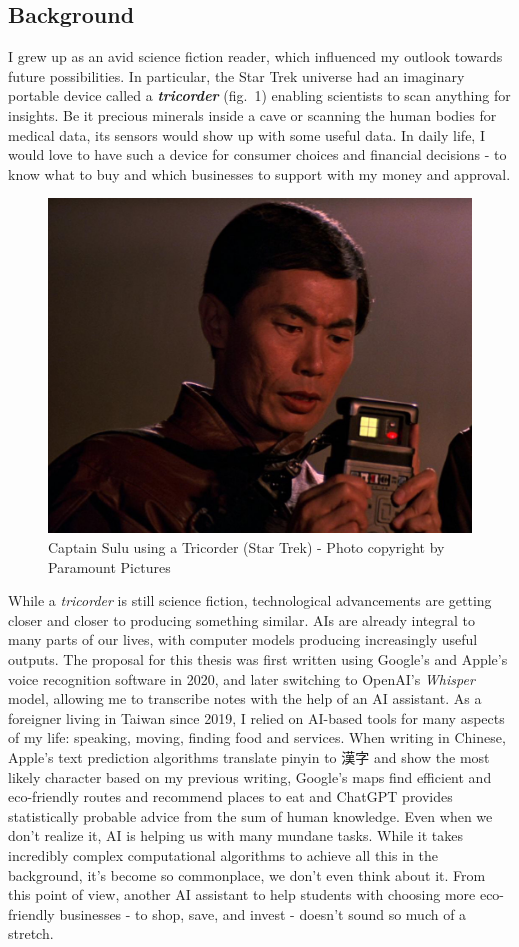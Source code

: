 \documentclass[
  letterpaper,
  DIV=11,
  numbers=noendperiod]{scrartcl}
\begin{document}
\subsection{Background}\label{background}

I grew up as an avid science fiction reader, which influenced my outlook
towards future possibilities. In particular, the Star Trek universe had
an imaginary portable device called a \textbf{\emph{tricorder}} (fig.~1)
enabling scientists to scan anything for insights. Be it precious
minerals inside a cave or scanning the human bodies for medical data,
its sensors would show up with some useful data. In daily life, I would
love to have such a device for consumer choices and financial decisions
- to know what to buy and which businesses to support with my money and
approval.

\begin{figure}[H]

{\centering \includegraphics[width=0.5\linewidth,height=\textheight,keepaspectratio]{./images/introduction/tricorder.jpg}

}

\caption{Captain Sulu using a Tricorder (Star Trek) - Photo copyright by
Paramount Pictures}

\end{figure}%

While a \emph{tricorder} is still science fiction, technological
advancements are getting closer and closer to producing something
similar. AIs are already integral to many parts of our lives, with
computer models producing increasingly useful outputs. The proposal for
this thesis was first written using Google's and Apple's voice
recognition software in 2020, and later switching to OpenAI's
\emph{Whisper} model, allowing me to transcribe notes with the help of
an AI assistant. As a foreigner living in Taiwan since 2019, I relied on
AI-based tools for many aspects of my life: speaking, moving, finding
food and services. When writing in Chinese, Apple's text prediction
algorithms translate pinyin to 漢字 and show the most likely character
based on my previous writing, Google's maps find efficient and
eco-friendly routes and recommend places to eat and ChatGPT provides
statistically probable advice from the sum of human knowledge. Even when
we don't realize it, AI is helping us with many mundane tasks. While it
takes incredibly complex computational algorithms to achieve all this in
the background, it's become so commonplace, we don't even think about
it. From this point of view, another AI assistant to help students with
choosing more eco-friendly businesses - to shop, save, and invest -
doesn't sound so much of a stretch.
\end{document}
